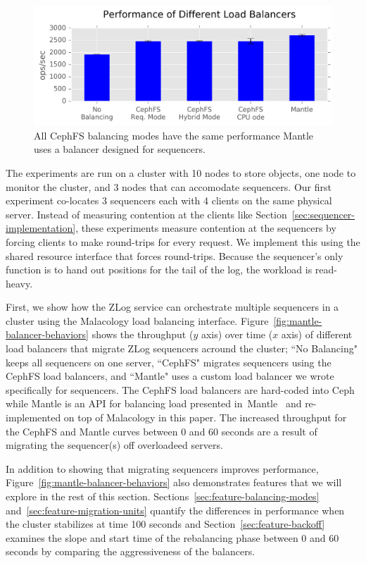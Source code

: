 \documentclass[preprint]{sigplanconf-eurosys}
\begin{document}
\begin{figure}[t!]
\centering
\includegraphics{figures/mantle-balancer-performance.png}
\caption{All CephFS balancing modes have the same performance Mantle uses a
balancer designed for sequencers.}\label{fig:mantle-balancer-performance}
\end{figure}

The experiments are run on a cluster with 10 nodes to store objects, one node
to monitor the cluster, and 3 nodes that can accomodate sequencers. Our first
experiment co-locates 3 sequencers each with 4 clients on the same physical
server.  Instead of measuring contention at the clients like
Section~\ref{sec:sequencer-implementation}, these experiments measure
contention at the sequencers by forcing clients to make round-trips for every
request. We implement this using the shared resource interface that forces
round-trips.  Because the sequencer's only function is to  hand out positions
for the tail of the log, the workload is read-heavy.

First, we show how the ZLog service can orchestrate multiple sequencers in a
cluster using the Malacology load balancing interface.
Figure~\ref{fig:mantle-balancer-behaviors} shows the throughput (\(y\) axis)
over time (\(x\) axis) of different load balancers that migrate ZLog sequencers
acround the cluster; ``No Balancing" keeps all sequencers on one server,
``CephFS" migrates sequencers using the CephFS load balancers, and ``Mantle"
uses a custom load balancer we wrote specifically for sequencers. The CephFS
load balancers are hard-coded into Ceph while Mantle is an API for
balancing load presented in~Mantle~\cite{sevilla:sc15-mantle} and
re-implemented on top of Malacology in this paper.  The increased throughput
for the CephFS and Mantle curves between 0 and 60 seconds are a result of
migrating the sequencer(s) off overloadeed servers.

In addition to showing that migrating sequencers improves performance,
Figure~\ref{fig:mantle-balancer-behaviors} also demonstrates features that we
will explore in the rest of this section.
Sections~\ref{sec:feature-balancing-modes}
and~\ref{sec:feature-migration-units} quantify the differences in performance
when the cluster stabilizes at time 100 seconds and
Section~\ref{sec:feature-backoff} examines the slope and start time of the
rebalancing phase between 0 and 60 seconds by comparing the aggressiveness of
the balancers.
\end{document}
